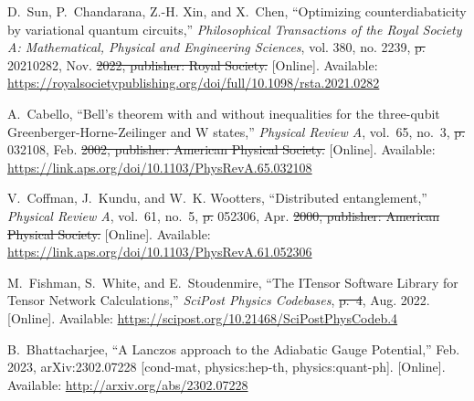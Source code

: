 \documentclass[a4paper,oneside,11pt]{book}
\providecommand{\DIFaddtex}[1]{{\protect\color{blue}\uwave{#1}}} %
\providecommand{\DIFdeltex}[1]{{\protect\color{red}\sout{#1}}}                      %
\providecommand{\DIFaddbegin}{} %
\providecommand{\DIFaddend}{} %
\providecommand{\DIFdelbegin}{} %
\providecommand{\DIFdelend}{} %
\providecommand{\DIFadd}[1]{\texorpdfstring{\DIFaddtex{#1}}{#1}} %
\providecommand{\DIFdel}[1]{\texorpdfstring{\DIFdeltex{#1}}{}} %
\newcommand{\DIFscaledelfig}{0.5}
\newlength{\DIFdelgraphicswidth} %
\newlength{\DIFdelgraphicsheight} %
\newcommand{\DIFaddincludegraphics}[2][]{{\color{blue}\fbox{\DIFOincludegraphics[#1]{#2}}}} %
\newcommand{\DIFdelincludegraphics}[2][]{%
\sbox{\DIFdelgraphicsbox}{\DIFOincludegraphics[#1]{#2}}%
\settoboxwidth{\DIFdelgraphicswidth}{\DIFdelgraphicsbox} %
\settoboxtotalheight{\DIFdelgraphicsheight}{\DIFdelgraphicsbox} %
\scalebox{\DIFscaledelfig}{%
\parbox[b]{\DIFdelgraphicswidth}{\usebox{\DIFdelgraphicsbox}\\[-\baselineskip] \rule{\DIFdelgraphicswidth}{0em}}\llap{\resizebox{\DIFdelgraphicswidth}{\DIFdelgraphicsheight}{%
\setlength{\unitlength}{\DIFdelgraphicswidth}%
\begin{picture}(1,1)%
\thicklines\linethickness{2pt} %
{\color[rgb]{1,0,0}\put(0,0){\framebox(1,1){}}}%
{\color[rgb]{1,0,0}\put(0,0){\line( 1,1){1}}}%
{\color[rgb]{1,0,0}\put(0,1){\line(1,-1){1}}}%
\end{picture}%
}\hspace*{3pt}}} %
} %
\DeclareRobustCommand{\DIFaddbegin}{\DIFOaddbegin \let\includegraphics\DIFaddincludegraphics} %
\DeclareRobustCommand{\DIFaddend}{\DIFOaddend \let\includegraphics\DIFOincludegraphics} %
\DeclareRobustCommand{\DIFdelbegin}{\DIFOdelbegin \let\includegraphics\DIFdelincludegraphics} %
\DeclareRobustCommand{\DIFdelend}{\DIFOaddend \let\includegraphics\DIFOincludegraphics} %
\begin{document}
\begin{thebibliography}{100}
\BIBentryALTinterwordspacing
D.~Sun, P.~Chandarana, Z.-H. Xin, and X.~Chen, ``Optimizing counterdiabaticity
  by variational quantum circuits,'' \emph{Philosophical Transactions of the
  Royal Society A: Mathematical, Physical and Engineering Sciences}, vol. 380,
  no. 2239,  \DIFdelbegin \DIFdel{p. }\DIFdelend 20210282, Nov. \DIFdelbegin \DIFdel{2022, publisher: Royal Society. }\DIFdelend \DIFaddbegin \DIFadd{2022. }\DIFaddend [Online]. Available:
  \url{https://royalsocietypublishing.org/doi/full/10.1098/rsta.2021.0282}
\BIBentrySTDinterwordspacing

\BIBentryALTinterwordspacing
A.~Cabello, ``Bell's theorem with and without inequalities for the three-qubit
  {Greenberger}-{Horne}-{Zeilinger} and {W} states,'' \emph{Physical Review A},
  vol.~65, no.~3,  \DIFdelbegin \DIFdel{p. }\DIFdelend 032108, Feb. \DIFdelbegin \DIFdel{2002, publisher: American Physical Society.
  }\DIFdelend \DIFaddbegin \DIFadd{2002. }\DIFaddend [Online]. Available:
  \url{https://link.aps.org/doi/10.1103/PhysRevA.65.032108}
\BIBentrySTDinterwordspacing

\BIBentryALTinterwordspacing
V.~Coffman, J.~Kundu, and W.~K. Wootters, ``Distributed entanglement,''
  \emph{Physical Review A}, vol.~61, no.~5,  \DIFdelbegin \DIFdel{p. }\DIFdelend 052306, Apr. \DIFdelbegin \DIFdel{2000, publisher:
  American Physical Society. }\DIFdelend \DIFaddbegin \DIFadd{2000. }\DIFaddend [Online].
  Available: \url{https://link.aps.org/doi/10.1103/PhysRevA.61.052306}
\BIBentrySTDinterwordspacing

\BIBentryALTinterwordspacing
M.~Fishman, S.~White, and E.~Stoudenmire, ``The {ITensor} {Software} {Library}
  for {Tensor} {Network} {Calculations},'' \emph{SciPost Physics Codebases},
  \DIFdelbegin \DIFdel{p.~4}\DIFdelend \DIFaddbegin \DIFadd{4--r0.3}\DIFaddend , Aug. 2022. [Online]. Available:
  \url{https://scipost.org/10.21468/SciPostPhysCodeb.4}
\BIBentrySTDinterwordspacing

\BIBentryALTinterwordspacing
B.~Bhattacharjee, ``A {Lanczos} approach to the {Adiabatic} {Gauge}
  {Potential},'' Feb. 2023, arXiv:2302.07228 [cond-mat, physics:hep-th,
  physics:quant-ph]. [Online]. Available: \url{http://arxiv.org/abs/2302.07228}
\BIBentrySTDinterwordspacing

\end{thebibliography}
\end{document}
